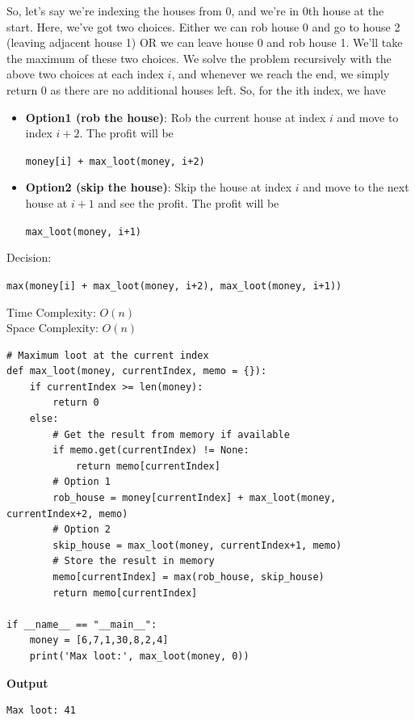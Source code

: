 \documentclass[a4paper,11pt]{book}
\begin{document}
\noindent So, let's say we're indexing the houses from 0, and we're in 0th house at the start. Here, we've got two choices. Either we can rob house 0 and go to house 2 (leaving adjacent house 1) OR we can leave house 0 and rob house 1. We'll take the maximum of these two choices. We solve the problem recursively with the above two choices at each index $i$, and whenever we reach the end, we simply return 0 as there are no additional houses left. So, for the ith index, we have

\begin{itemize}
\item \textbf{Option1 (rob the house)}: Rob the current house at index $i$ and move to index $i+2$. The profit will be \begin{center}
\lstinline{money[i] + max_loot(money, i+2)}
\end{center}
\item \textbf{Option2 (skip the house)}: Skip the house at index $i$ and move to the next house at $i+1$ and see the profit. The profit will be \begin{center}
\lstinline{max_loot(money, i+1)}
\end{center}
\end{itemize}

\noindent Decision: \begin{center}
\lstinline{max(money[i] + max_loot(money, i+2), max_loot(money, i+1))}
\end{center}

\noindent Time Complexity: $O(n)$\\
\noindent Space Complexity: $O(n)$

\begin{lstlisting}
# Maximum loot at the current index
def max_loot(money, currentIndex, memo = {}):
    if currentIndex >= len(money):
        return 0
    else:
        # Get the result from memory if available
        if memo.get(currentIndex) != None:
            return memo[currentIndex]
        # Option 1
        rob_house = money[currentIndex] + max_loot(money, currentIndex+2, memo)
        # Option 2
        skip_house = max_loot(money, currentIndex+1, memo)
        # Store the result in memory
        memo[currentIndex] = max(rob_house, skip_house)
        return memo[currentIndex]

if __name__ == "__main__":
    money = [6,7,1,30,8,2,4]
    print('Max loot:', max_loot(money, 0))
\end{lstlisting}
\textbf{Output}
\begin{lstlisting}
Max loot: 41
\end{lstlisting}
\end{document}
